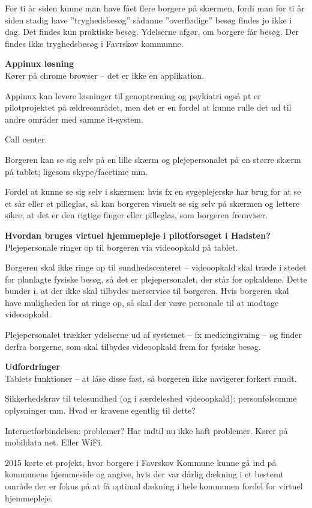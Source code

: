 For ti år siden kunne man have fået flere borgere på skærmen, fordi man for ti år siden stadig have ”tryghedsbesøg”  sådanne ”overflødige” besøg findes jo ikke i dag. Det findes kun praktiske besøg. Ydelserne afgør, om borgere får besøg. Der findes ikke tryghedsbesøg i Favrskov kommunne.

\textbf{Appinux løsning}
\\
Kører på chrome browser – det er ikke en applikation.
 
Appinux kan levere løsninger til genoptræning og psykiatri også  pt er pilotprojektet på ældreområdet, men det er en fordel at kunne rulle det ud til andre områder med samme it-system.
 
 Call center.
 
Borgeren kan se sig selv på en lille skærm og plejepersonalet på en større skærm på tablet; ligesom skype/facetime mm.
 
 Fordel at kunne se sig selv i skærmen: hvis fx en sygeplejerske har brug for at se et sår eller et pilleglas, så kan borgeren visuelt se sig selv på skærmen og lettere sikre, at det er den rigtige finger eller pilleglas, som borgeren fremviser.
 
 \textbf{Hvordan bruges virtuel hjemmepleje i pilotforsøget i Hadsten?
}
\\
Plejepersonale ringer op til borgeren via videoopkald på tablet. 

Borgeren skal ikke ringe op til sundhedscenteret – videoopkald skal træde i stedet for planlagte fysiske besøg, så det er plejepersonalet, der står for opkaldene. Dette bunder i, at der ikke skal tilbydes merservice til borgeren. Hvis borgeren skal have muligheden for at ringe op, så skal der være personale til at modtage videoopkald. 

Plejepersonalet trækker ydelserne ud af systemet – fx medicingivning – og finder derfra borgerne, som skal tilbydes videoopkald frem for fysiske besøg. 

\textbf{Udfordringer}
\\
Tablets funktioner – at låse disse fast, så borgeren ikke navigerer forkert rundt.

Sikkerhedskrav til telesundhed (og i særdeleshed videoopkald): personfølsomme oplysninger mm. Hvad er kravene egentlig til dette? 

Internetforbindelsen: problemer? Har indtil nu ikke haft problemer. Kører på mobildata net. Eller WiFi. 

2015 kørte et projekt, hvor borgere i Favrskov Kommune kunne gå ind på kommunens hjemmeside og angive, hvis der var dårlig dækning i et bestemt område  der er fokus på at få optimal dækning i hele kommunen  fordel for virtuel hjemmepleje. 

